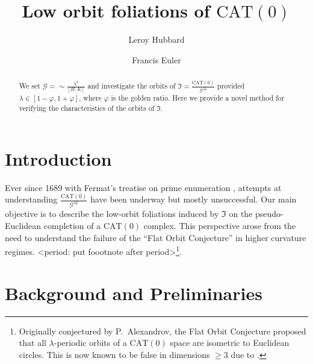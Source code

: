 \documentclass{amsart}
\title{Low orbit foliations of $\mathrm{CAT}(0)$}
\author{Leroy Hubbard}
\author{Francis Euler}
\begin{document}
\begin{abstract}
We set $\mathcal{G} = \sim\frac{\lambda^2}{[H : K]}$ and investigate the orbits of 
$\mathfrak{I} = \frac{\mathrm{CAT}(0)}{\mathcal{G}^{\lambda k}}$ 
provided $\lambda \in [1-\varphi, 1+\varphi]$, where $\varphi$ is the golden ratio. 
Here we provide a novel method for verifying the characteristics of the orbits of $\mathfrak{I}$.
\end{abstract}

\maketitle


\section{Introduction}

Ever since 1689 with Fermat's treatise on prime enumeration \cite{fermat89}, 
attempts at understanding $\frac{\mathrm{CAT}(0)}{\mathcal{G}^{\lambda k}}$ have been underway but mostly unsuccessful. 
Our main objective is to describe the low-orbit foliations induced by $\mathfrak{I}$ on 
the pseudo-Euclidean completion of a $\mathrm{CAT}(0)$ complex. 
This perspective arose from the need to understand the failure of the ``Flat Orbit Conjecture'' in higher curvature %
regimes. <period: put foootnote after period>\footnote{
Originally conjectured by P.\ Alexandrov, the Flat Orbit Conjecture proposed that all $\lambda$-periodic orbits of a $\mathrm{CAT}(0)$ space are isometric to Euclidean circles. 
This is now known to be false in dimensions $\geq 3$ due to \cite{hubard23}.}.

\section{Background and Preliminaries}
\end{document}
